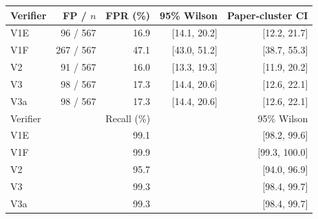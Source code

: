 \begin{tabular}{lrrrr}
\toprule
Verifier & FP / $n$ & FPR (\%) & 95\% Wilson & Paper-cluster CI \\
\midrule
V1E & 96 / 567 & 16.9 & [14.1, 20.2] & [12.2, 21.7] \\
V1F & 267 / 567 & 47.1 & [43.0, 51.2] & [38.7, 55.3] \\
V2 & 91 / 567 & 16.0 & [13.3, 19.3] & [11.9, 20.2] \\
V3 & 98 / 567 & 17.3 & [14.4, 20.6] & [12.6, 22.1] \\
V3a & 98 / 567 & 17.3 & [14.4, 20.6] & [12.6, 22.1] \\
\midrule
Verifier & \multicolumn{2}{r}{Recall (\%)} & \multicolumn{2}{r}{95\% Wilson} \\
\midrule
V1E & \multicolumn{2}{r}{99.1} & \multicolumn{2}{r}{[98.2, 99.6]} \\
V1F & \multicolumn{2}{r}{99.9} & \multicolumn{2}{r}{[99.3, 100.0]} \\
V2 & \multicolumn{2}{r}{95.7} & \multicolumn{2}{r}{[94.0, 96.9]} \\
V3 & \multicolumn{2}{r}{99.3} & \multicolumn{2}{r}{[98.4, 99.7]} \\
V3a & \multicolumn{2}{r}{99.3} & \multicolumn{2}{r}{[98.4, 99.7]} \\
\bottomrule
\end{tabular}
